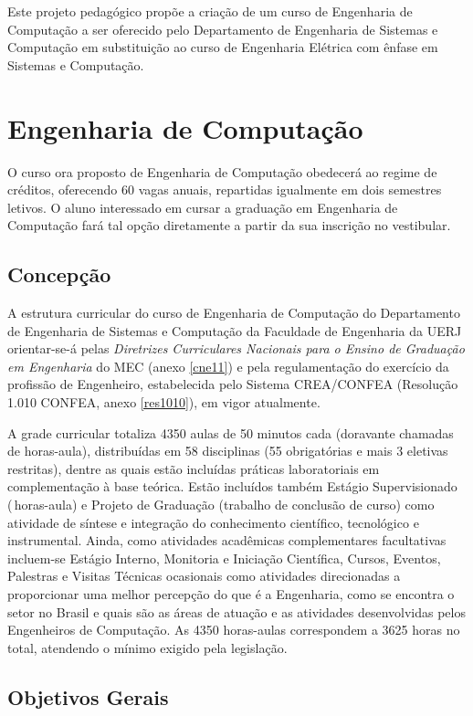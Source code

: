 Este projeto pedagógico propõe a criação de um curso de Engenharia de Computação a ser oferecido pelo Departamento de Engenharia de Sistemas e Computação em substituição ao curso de Engenharia Elétrica com ênfase em Sistemas e Computação.

\chapter{Engenharia de Computação}
O curso ora proposto de Engenharia de Computação obedecerá ao regime de créditos, oferecendo 60 vagas anuais, repartidas igualmente em dois semestres letivos. O aluno interessado em cursar a graduação em Engenharia de Computação fará tal opção diretamente a partir da sua inscrição no vestibular.

\section{Concepção}

A estrutura curricular do curso de Engenharia de Computação do Departamento de Engenharia de Sistemas e Computação da Faculdade de Engenharia da UERJ orientar-se-á pelas \textit{Diretrizes Curriculares Nacionais para o Ensino de Graduação em Engenharia} do MEC (anexo \ref{cne11}) e pela regulamentação do exercício da profissão de Engenheiro, estabelecida pelo Sistema CREA/CONFEA (Resolução 1.010 CONFEA, anexo \ref{res1010}), em vigor atualmente.

A grade curricular totaliza 4350 aulas de 50 minutos cada (doravante chamadas de horas-aula), distribuídas em 58 disciplinas (55 obrigatórias e mais 3 eletivas restritas), dentre as quais estão incluídas práticas laboratoriais em complementação à base teórica. Estão incluídos também Estágio Supervisionado (\EstSupCH\,horas-aula) e Projeto de Graduação (trabalho de conclusão de curso) como atividade de síntese e integração do conhecimento científico, tecnológico e instrumental. Ainda, como atividades acadêmicas complementares facultativas incluem-se Estágio Interno, Monitoria e Iniciação Científica, Cursos, Eventos, Palestras e Visitas Técnicas ocasionais como atividades direcionadas a proporcionar uma melhor percepção do que é a Engenharia, como se encontra o setor no Brasil e quais são as áreas de atuação e as atividades desenvolvidas pelos Engenheiros de Computação. As 4350 horas-aulas correspondem a 3625 horas no total, atendendo o mínimo exigido pela legislação.

\section{Objetivos Gerais}

